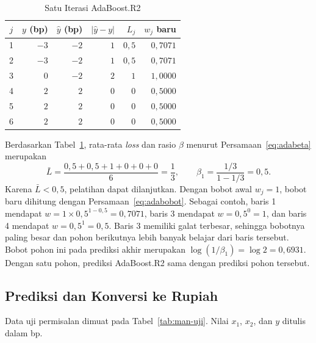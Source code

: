 \begin{table}[htbp]
  \caption{Satu Iterasi AdaBoost.R2}
  \label{tab:man-ada}
  \centering
  \begingroup
  \footnotesize
  \setlength{\tabcolsep}{6pt}
  \begin{tabular}{|c|r|r|r|r|r|}
    \hline
    \textbf{$j$} & \textbf{$y$ (bp)} & \textbf{$\hat{y}$ (bp)} & \textbf{$|\hat{y}-y|$} & \textbf{$L_j$} & \textbf{$w_j$ baru} \\
    \hline
    1 & $-3$ & $-2$ & $1$ & $0{,}5$ & $0{,}7071$ \\
    2 & $-3$ & $-2$ & $1$ & $0{,}5$ & $0{,}7071$ \\
    3 & $0$ & $-2$ & $2$ & $1$ & $1{,}0000$ \\
    4 & $2$ & $2$ & $0$ & $0$ & $0{,}5000$ \\
    5 & $2$ & $2$ & $0$ & $0$ & $0{,}5000$ \\
    6 & $2$ & $2$ & $0$ & $0$ & $0{,}5000$ \\
    \hline
  \end{tabular}
  \endgroup
\end{table}

Berdasarkan Tabel~\ref{tab:man-ada}, rata-rata \textit{loss} dan rasio $\beta$
menurut Persamaan~\eqref{eq:adabeta} merupakan
\begin{equation*}
  \bar{L} = \frac{0{,}5 + 0{,}5 + 1 + 0 + 0 + 0}{6} = \frac{1}{3}, \qquad
  \beta_1 = \frac{1/3}{1 - 1/3} = 0{,}5 .
\end{equation*}
Karena $\bar{L} < 0{,}5$, pelatihan dapat dilanjutkan. Dengan bobot awal
$w_j = 1$, bobot baru dihitung dengan Persamaan~\eqref{eq:adabobot}. Sebagai
contoh, baris 1 mendapat $w = 1 \times 0{,}5^{1 - 0{,}5} = 0{,}7071$, baris 3
mendapat $w = 0{,}5^{0} = 1$, dan baris 4 mendapat $w = 0{,}5^{1} = 0{,}5$.
Baris 3 memiliki galat terbesar, sehingga bobotnya paling besar dan pohon
berikutnya lebih banyak belajar dari baris tersebut. Bobot pohon ini pada
prediksi akhir merupakan $\log(1/\beta_1) = \log 2 = 0{,}6931$. Dengan satu
pohon, prediksi AdaBoost.R2 sama dengan prediksi pohon tersebut.

\subsection{Prediksi dan Konversi ke Rupiah}
Data uji permisalan dimuat pada Tabel~\ref{tab:man-uji}. Nilai $x_1$, $x_2$,
dan $y$ ditulis dalam bp.


